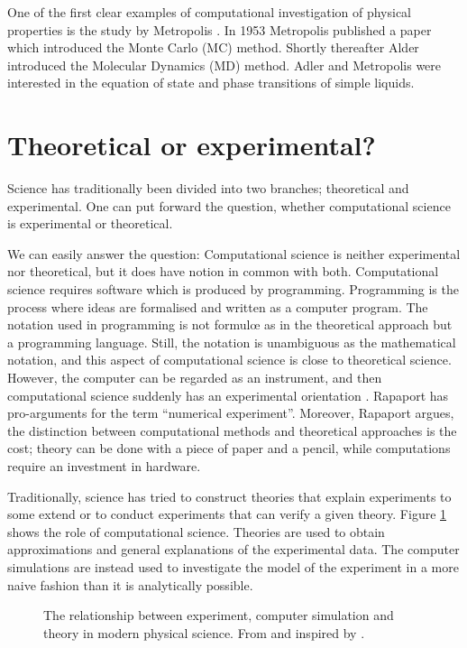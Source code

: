 One of the first clear examples of computational investigation of
physical properties is the study by Metropolis \etal
\cite{Metropolis53}. In 1953 Metropolis \etal published a paper which
introduced the Monte Carlo (MC) method. Shortly thereafter Alder \etal
\cite{Alder57} introduced the Molecular Dynamics (MD) method. Adler
\etal and Metropolis \etal were interested in the equation of state and
phase transitions of simple liquids.

\section{Theoretical or experimental?}
\label{sect:TheoryOrExp}
Science has traditionally been divided into two branches; theoretical
and experimental. One can put forward the question, whether
computational science is experimental or theoretical.

We can easily answer the question: Computational science is neither
experimental nor theoretical, but it does have notion in common with both.
Computational science requires software 
which is produced by programming. Programming is the process where
ideas are formalised and written as a computer
program. The notation used in programming is not formul{\oe} as in
the theoretical approach but a programming language. Still, the
notation is unambiguous as the mathematical notation, and this aspect
of computational science is close to theoretical science. However, the
computer can be regarded as an instrument, and then computational science
suddenly has an experimental orientation \cite{OGM93}. Rapaport
\cite{Rapaport95} has pro-arguments for the term ``numerical
experiment''. Moreover, Rapaport argues, the distinction between
computational methods and theoretical approaches is the cost; theory
can be done with a piece of paper and a pencil, while computations
require an investment in hardware.

Traditionally, science has tried to construct
theories that explain experiments to some extend or to conduct
experiments that can verify a given theory. Figure
\ref{fig:ExpModelTheory} shows the role of computational
science. Theories are used to obtain approximations and general
explanations of the experimental data. The computer simulations are
instead used to investigate the model of the experiment in a more
naive fashion than it is analytically possible.


\begin{figure}
  \begin{center}
    
  \end{center}
  \caption[The role of computational science]{The relationship between
  experiment, computer simulation and theory in modern physical
  science. From \protect\cite{Geisshirt96b} and inspired by
  \protect\cite{Allen87}.\label{fig:ExpModelTheory}}
\end{figure}

